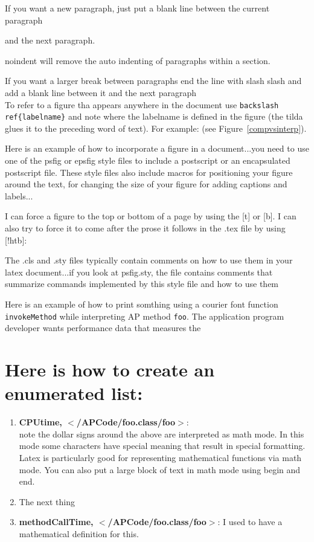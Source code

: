 \documentclass[twocolumn]{article}
\begin{document}
If you want a new paragraph, just put a blank line between the 
current paragraph

and the next paragraph.

\noindent noindent will remove the auto indenting of paragraphs within
a section.

If you want a larger break between paragraphs end the line with slash slash
and add a blank line between it and the next paragraph\\

To refer to a figure tha appears anywhere in the document use 
{\tt backslash ref\{labelname\}} and note where the labelname is defined in
the figure (the tilda glues it to the preceding word of text).
For example: (see Figure~\ref{compvsinterp}). 

Here is an example of how to incorporate a figure in a document...you need
to use one of the psfig or epsfig style files to include a postscript or 
an encapsulated postscript file.  These style files also include macros for
positioning your figure around the text, for changing the size of your figure
for adding captions and labels...  


I can force a figure to the top or bottom of a page by using the [t] or [b].
I can also try to force it to come after the prose it follows in the .tex
file by using [!htb]:



The .cls and .sty files typically contain comments on how to use them in your latex
document...if you look at psfig.sty, the file contains comments that summarize
commands implemented by this style file and how to use them

Here is an example of how to print somthing using a courier font
function \texttt{invokeMethod} while interpreting AP method \texttt{foo}. The 
application program developer wants performance data that measures the



\section {Here is how to create an enumerated list:}

\begin{enumerate}
\item {\bf CPUtime, $<$/APCode/foo.class/foo$>$}:\\
  note the dollar signs around the above are interpreted as math mode.  In
  this mode some characters have special meaning that result in special
  formatting.  Latex is particularly good for representing mathematical
  functions via math mode.  You can also put a large block of text in math
  mode using begin and end. 

\item  The next thing


\item {\bf methodCallTime, $<$/APCode/foo.class/foo$>$}:
  I used to have a mathematical definition for this.
\end{enumerate}
\end{document}
